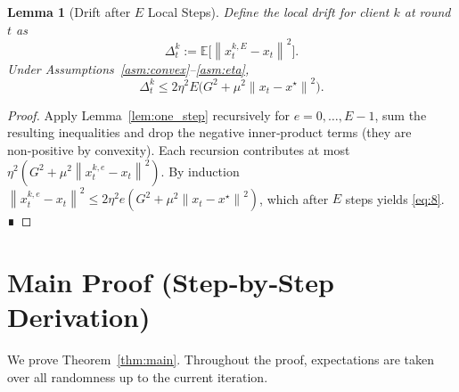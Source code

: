 \documentclass[11pt]{article}
\newtheorem{lemma}{Lemma}
\newcommand{\E}{\mathbb{E}}
\newcommand{\norm}[1]{\left\|#1\right\|}
\begin{document}
\begin{lemma}[Drift after $E$ Local Steps]\label{lem:local_error}
Define the local drift for client $k$ at round $t$ as
\[
    \Delta_{t}^{k}:= \E\!\bigl[\norm{x_{t}^{k,E}-x_t}^{2}\bigr].
\]
Under Assumptions~\ref{asm:convex}–\ref{asm:eta},
\[
    \Delta_{t}^{k}\le
    2\eta^{2}E\bigl(G^{2}+\mu^{2}\norm{x_t-x^{\star}}^{2}\bigr).
\tag{8}
\]
\end{lemma}
\begin{proof}
Apply Lemma~\ref{lem:one_step} recursively for $e=0,\dots,E-1$, sum the resulting inequalities and drop the negative inner‑product terms (they are non‑positive by convexity).  Each recursion contributes at most $\eta^{2}(G^{2}+\mu^{2}\norm{x_{t}^{k,e}-x_t}^{2})$.  By induction $\norm{x_{t}^{k,e}-x_t}^{2}\le 2\eta^{2}e(G^{2}+\mu^{2}\norm{x_t-x^{\star}}^{2})$, which after $E$ steps yields \eqref{eq:8}.  ∎
\end{proof}

\section*{Main Proof (Step‑by‑Step Derivation)}
We prove Theorem~\ref{thm:main}.  Throughout the proof, expectations are taken over all randomness up to the current iteration.
\end{document}
